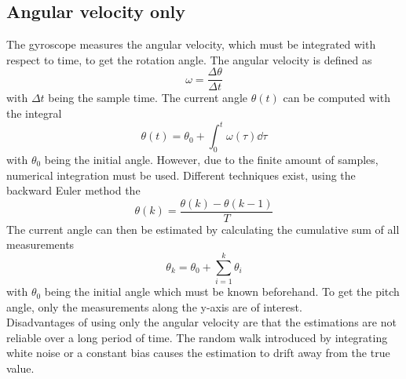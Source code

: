 \subsection{Angular velocity only}
\cite{Kok2017}
The gyroscope measures the angular velocity, which must be integrated with respect to time, to get the rotation angle.
The angular velocity is defined as
\begin{equation}
	\omega = \frac{\Delta\theta}{\Delta t}
\end{equation}
with $\Delta t$ being the sample time.
The current angle $\theta(t)$ can be computed with the integral
\begin{equation}
	\theta(t) = \theta_0 + \int_0^t \omega(\tau)\dd{\tau}
\end{equation}
with $\theta_0$ being the initial angle.
However, due to the finite amount of samples, numerical integration must be used.
Different techniques exist, using the backward Euler method the
\begin{equation}
	\theta(k) = \frac{\theta(k) - \theta(k - 1)}{T}
\end{equation}
The current angle can then be estimated by calculating the cumulative sum of all measurements
\begin{equation}
	\theta_k = \theta_0 + \sum_{i = 1}^k \theta_i
\end{equation}
with $\theta_0$ being the initial angle which must be known beforehand.
To get the pitch angle, only the measurements along the y-axis are of interest.\\
Disadvantages of using only the angular velocity are that the estimations are not reliable over a long period of time.
The random walk introduced by integrating white noise or a constant bias causes the estimation to drift away from the true value.


